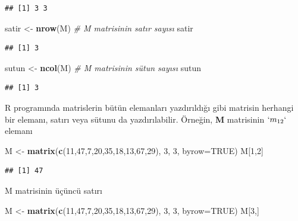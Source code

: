 \documentclass[
]{book}
\newenvironment{Shaded}{\begin{snugshade}}{\end{snugshade}}
\newcommand{\AttributeTok}[1]{\textcolor[rgb]{0.13,0.29,0.53}{#1}}
\newcommand{\CommentTok}[1]{\textcolor[rgb]{0.56,0.35,0.01}{\textit{#1}}}
\newcommand{\ConstantTok}[1]{\textcolor[rgb]{0.56,0.35,0.01}{#1}}
\newcommand{\DecValTok}[1]{\textcolor[rgb]{0.00,0.00,0.81}{#1}}
\newcommand{\FunctionTok}[1]{\textcolor[rgb]{0.13,0.29,0.53}{\textbf{#1}}}
\newcommand{\NormalTok}[1]{#1}
\newcommand{\OtherTok}[1]{\textcolor[rgb]{0.56,0.35,0.01}{#1}}
\begin{document}
\begin{verbatim}
## [1] 3 3
\end{verbatim}

\begin{Shaded}
\begin{Highlighting}[]
\NormalTok{satir }\OtherTok{\textless{}{-}} \FunctionTok{nrow}\NormalTok{(M)        }\CommentTok{\# M matrisinin satır sayısı }
\NormalTok{satir }
\end{Highlighting}
\end{Shaded}

\begin{verbatim}
## [1] 3
\end{verbatim}

\begin{Shaded}
\begin{Highlighting}[]
\NormalTok{sutun }\OtherTok{\textless{}{-}} \FunctionTok{ncol}\NormalTok{(M)        }\CommentTok{\# M matrisinin sütun sayısı }
\NormalTok{sutun }
\end{Highlighting}
\end{Shaded}

\begin{verbatim}
## [1] 3
\end{verbatim}

R programında matrislerin bütün elemanları yazdırıldığı gibi matrisin herhangi bir elemanı, satırı veya sütunu da yazdırılabilir. Örneğin, \textbf{M} matrisinin \(`m_{12}`\) elemanı

\begin{Shaded}
\begin{Highlighting}[]
\NormalTok{M }\OtherTok{\textless{}{-}} \FunctionTok{matrix}\NormalTok{(}\FunctionTok{c}\NormalTok{(}\DecValTok{11}\NormalTok{,}\DecValTok{47}\NormalTok{,}\DecValTok{7}\NormalTok{,}\DecValTok{20}\NormalTok{,}\DecValTok{35}\NormalTok{,}\DecValTok{18}\NormalTok{,}\DecValTok{13}\NormalTok{,}\DecValTok{67}\NormalTok{,}\DecValTok{29}\NormalTok{), }\DecValTok{3}\NormalTok{, }\DecValTok{3}\NormalTok{, }\AttributeTok{byrow=}\ConstantTok{TRUE}\NormalTok{) }
\NormalTok{M[}\DecValTok{1}\NormalTok{,}\DecValTok{2}\NormalTok{]}
\end{Highlighting}
\end{Shaded}

\begin{verbatim}
## [1] 47
\end{verbatim}

M matrisinin üçüncü satırı

\begin{Shaded}
\begin{Highlighting}[]
\NormalTok{M }\OtherTok{\textless{}{-}} \FunctionTok{matrix}\NormalTok{(}\FunctionTok{c}\NormalTok{(}\DecValTok{11}\NormalTok{,}\DecValTok{47}\NormalTok{,}\DecValTok{7}\NormalTok{,}\DecValTok{20}\NormalTok{,}\DecValTok{35}\NormalTok{,}\DecValTok{18}\NormalTok{,}\DecValTok{13}\NormalTok{,}\DecValTok{67}\NormalTok{,}\DecValTok{29}\NormalTok{), }\DecValTok{3}\NormalTok{, }\DecValTok{3}\NormalTok{, }\AttributeTok{byrow=}\ConstantTok{TRUE}\NormalTok{) }
\NormalTok{M[}\DecValTok{3}\NormalTok{,]}
\end{Highlighting}
\end{Shaded}
\end{document}
